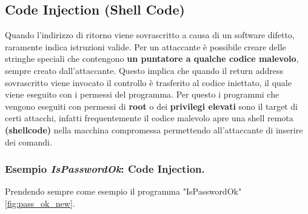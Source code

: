 \subsection{Code Injection (Shell Code)}
Quando l'indirizzo di ritorno viene sovrascritto a causa di un software difetto, raramente indica istruzioni valide. Per un attaccante è possibile creare delle stringhe speciali che contengono \textbf{un puntatore a qualche codice malevolo}, sempre creato dall'attaccante. Questo implica che quando il return address sovrascritto viene invocato il controllo è trasferito al codice iniettato, il quale viene eseguito con i permessi del programma. Per questo i programmi che vengono eseguiti con permessi di \textbf{root} o dei \textbf{privilegi elevati} sono il target di certi attacchi, infatti frequentemente il codice malevolo apre una shell remota \textbf{(shellcode)} nella macchina compromessa permettendo all'attaccante di inserire dei comandi.

\subsubsection{Esempio \textit{IsPasswordOk}: Code Injection.} Prendendo sempre come esempio il programma "IsPasswordOk" \ref{fig:pass_ok_new}.

